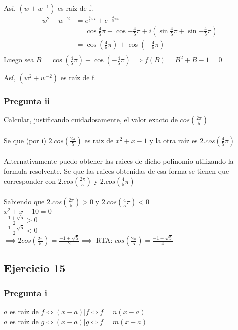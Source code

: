 Así, $ (w+w^{-1}) $ es raíz de f.
\begin{align*}
    w^2 + w^{-2} &= e^{\frac{4}{5} \pi i} + e^{-\frac{4}{5} \pi i} \\
    &= \cos{\frac{4}{5} \pi} + \cos{-\frac{4}{5} \pi} + i\left( \sin{\frac{4}{5} \pi} + \sin{-\frac{4}{5} \pi} \right) \\
    &= \cos{(\frac{4}{5} \pi)} + \cos{(-\frac{4}{5} \pi)} \\
\end{align*}
Luego sea $ B = \cos{(\frac{4}{5} \pi)} + \cos{(-\frac{4}{5} \pi)} \implies f(B) = B^2 + B - 1 = 0 $ 

Así, $ (w^2 + w^{-2}) $ es raíz de f.

\subsubsection{Pregunta ii}
Calcular, justificando cuidadosamente, el valor exacto de $cos(\frac{2\pi}{5})$ \\ \\
Se que (por i) $2.cos(\frac{2\pi}{5})$ es raiz de $x^{2}+x-1$ y la otra raíz es $2.cos(\frac{4}{5}\pi)$ \\ \\
Alternativamente puedo obtener las raices de dicho polinomio utilizando la formula resolvente. Se que las raices obtenidas de esa forma se tienen que corresponder con $2.cos(\frac{2\pi}{5})$ y $2.cos(\frac{4}{5}\pi)$ \\ \\
Sabiendo que $2.cos(\frac{2\pi}{5}) > 0$ y $2.cos(\frac{4}{5}\pi) < 0$ \\
$x^{2}+x-10 = 0$ \\
$\frac{-1+\sqrt{5}}{2} > 0$ \\
$\frac{-1-\sqrt{5}}{2} < 0 $ \\
$\implies 2cos(\frac{2\pi}{5}) = \frac{-1+\sqrt{5}}{2} \implies $ RTA: $cos(\frac{2\pi}{5}) = \frac{-1+\sqrt{5}}{4}$


\subsection{Ejercicio 15}
\subsubsection{Pregunta i}

$a$ es raíz de $f \iff (x-a)|f \iff f = n(x-a) $ \\
$a$ es raíz de $g \iff (x-a)|g \iff f = m(x-a) $ 

